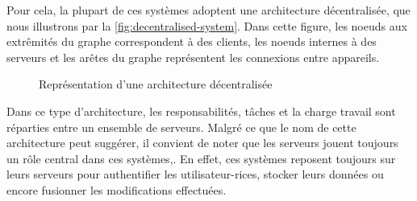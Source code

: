 Pour cela, la plupart de ces systèmes adoptent une architecture décentralisée, que nous illustrons par la \autoref{fig:decentralised-system}.
Dans cette figure, les noeuds aux extrêmités du graphe correspondent à des clients, les noeuds internes à des serveurs et les arêtes du graphe représentent les connexions entre appareils.
\begin{figure}[!ht]
  \centering
  \caption[Caption for decentralised-system]{Représentation d'une architecture décentralisée \cite{1964-distributed-communications-networks-baran}}
  \label{fig:decentralised-system}
\end{figure}

Dans ce type d'architecture, les responsabilités, tâches et la charge travail sont réparties entre un ensemble de serveurs.
Malgré ce que le nom de cette architecture peut suggérer, il convient de noter que les serveurs jouent toujours un rôle central dans ces systèmes,.
En effet, ces systèmes reposent toujours sur leurs serveurs pour authentifier les utilisateur-rices, stocker leurs données ou encore fusionner les modifications effectuées.\\

